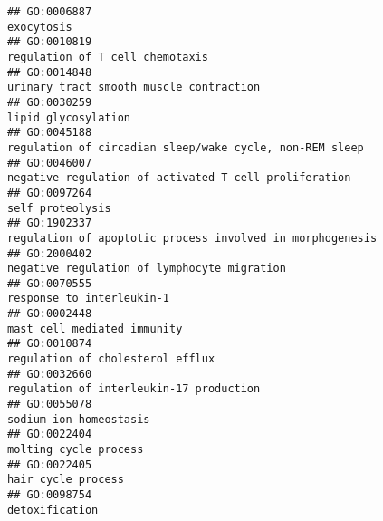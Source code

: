 \documentclass[
]{article}
\begin{document}
\begin{verbatim}
## GO:0006887                                                                                                                                       exocytosis
## GO:0010819                                                                                                                  regulation of T cell chemotaxis
## GO:0014848                                                                                                          urinary tract smooth muscle contraction
## GO:0030259                                                                                                                              lipid glycosylation
## GO:0045188                                                                                          regulation of circadian sleep/wake cycle, non-REM sleep
## GO:0046007                                                                                            negative regulation of activated T cell proliferation
## GO:0097264                                                                                                                                 self proteolysis
## GO:1902337                                                                                        regulation of apoptotic process involved in morphogenesis
## GO:2000402                                                                                                      negative regulation of lymphocyte migration
## GO:0070555                                                                                                                        response to interleukin-1
## GO:0002448                                                                                                                      mast cell mediated immunity
## GO:0010874                                                                                                                 regulation of cholesterol efflux
## GO:0032660                                                                                                          regulation of interleukin-17 production
## GO:0055078                                                                                                                           sodium ion homeostasis
## GO:0022404                                                                                                                            molting cycle process
## GO:0022405                                                                                                                               hair cycle process
## GO:0098754                                                                                                                                   detoxification

\end{verbatim}
\end{document}
